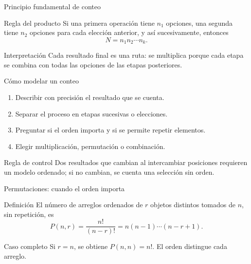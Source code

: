 \documentclass[10pt,aspectratio=169]{beamer}
\begin{document}
\begin{frame}{Principio fundamental de conteo}
  \small
  \begin{block}{Regla del producto}
    Si una primera operación tiene $n_1$ opciones, una segunda tiene $n_2$
    opciones para cada elección anterior, y así sucesivamente, entonces
    \[
      N=n_1n_2\cdots n_k.
    \]
  \end{block}
  \pause
  \begin{exampleblock}{Interpretación}
    Cada resultado final es una ruta: se multiplica porque cada etapa se
    combina con todas las opciones de las etapas posteriores.
  \end{exampleblock}
\end{frame}

\begin{frame}{Cómo modelar un conteo}
  \footnotesize
  \begin{enumerate}\itemsep=0.12cm
    \item Describir con precisión el resultado que se cuenta.
    \item Separar el proceso en etapas sucesivas o elecciones.
    \item Preguntar si el orden importa y si se permite repetir elementos.
    \item Elegir multiplicación, permutación o combinación.
  \end{enumerate}
  \vspace{0.1cm}
  \begin{alertblock}{Regla de control}
    Dos resultados que cambian al intercambiar posiciones requieren un modelo
    ordenado; si no cambian, se cuenta una selección sin orden.
  \end{alertblock}
\end{frame}

\begin{frame}{Permutaciones: cuando el orden importa}
  \small
  \begin{block}{Definición}
    El número de arreglos ordenados de $r$ objetos distintos tomados de $n$,
    sin repetición, es
    \[
      P(n,r)=\frac{n!}{(n-r)!}=n(n-1)\cdots(n-r+1).
    \]
  \end{block}
  \begin{exampleblock}{Caso completo}
    Si $r=n$, se obtiene $P(n,n)=n!$. El orden distingue cada arreglo.
  \end{exampleblock}
\end{frame}
\end{document}
